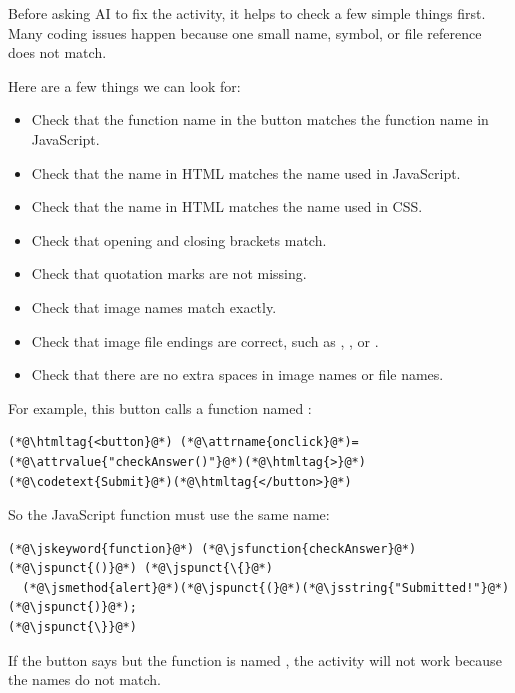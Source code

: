 \documentclass{article}
\begin{document}
Before asking AI to fix the activity, it helps to check a few simple things first. Many coding issues happen because one small name, symbol, or file reference does not match.

Here are a few things we can look for:

\begin{itemize}[leftmargin=1.2cm, itemsep=4pt]
  \item Check that the function name in the button matches the function name in JavaScript.
  \item Check that the  name in HTML matches the name used in JavaScript.
  \item Check that the  name in HTML matches the name used in CSS.
  \item Check that opening and closing brackets match.
  \item Check that quotation marks are not missing.
  \item Check that image names match exactly.
  \item Check that image file endings are correct, such as , , or .
  \item Check that there are no extra spaces in image names or file names.
\end{itemize}

\vspace{0.2cm}

For example, this button calls a function named :

\begin{lstlisting}
(*@\htmltag{<button}@*) (*@\attrname{onclick}@*)=(*@\attrvalue{"checkAnswer()"}@*)(*@\htmltag{>}@*)(*@\codetext{Submit}@*)(*@\htmltag{</button>}@*)
\end{lstlisting}

So the JavaScript function must use the same name:

\begin{lstlisting}
(*@\jskeyword{function}@*) (*@\jsfunction{checkAnswer}@*)(*@\jspunct{()}@*) (*@\jspunct{\{}@*)
  (*@\jsmethod{alert}@*)(*@\jspunct{(}@*)(*@\jsstring{"Submitted!"}@*)(*@\jspunct{)}@*);
(*@\jspunct{\}}@*)
\end{lstlisting}

If the button says  but the function is named , the activity will not work because the names do not match.
\end{document}
